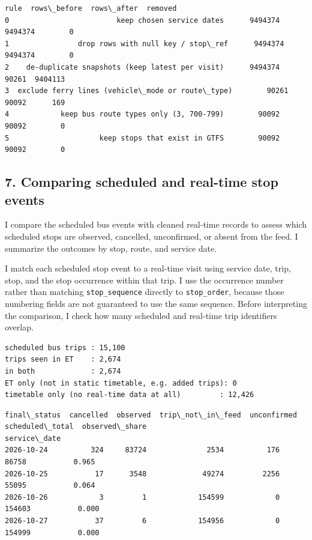 \documentclass[11pt]{article}
\begin{document}
    
    \begin{Verbatim}[commandchars=\\\{\}]
                                               rule  rows\_before  rows\_after  removed
0                         keep chosen service dates      9494374     9494374        0
1                drop rows with null key / stop\_ref      9494374     9494374        0
2    de-duplicate snapshots (keep latest per visit)      9494374       90261  9404113
3  exclude ferry lines (vehicle\_mode or route\_type)        90261       90092      169
4            keep bus route types only (3, 700-799)        90092       90092        0
5                     keep stops that exist in GTFS        90092       90092        0
    \end{Verbatim}

    
    \subsection{7. Comparing scheduled and real-time stop
events}\label{comparing-scheduled-and-real-time-stop-events}

I compare the scheduled bus events with cleaned real-time records to
assess which scheduled stops are observed, cancelled, unconfirmed, or
absent from the feed. I summarize the outcomes by stop, route, and
service date.

    I match each scheduled stop event to a real-time visit using service
date, trip, stop, and the stop occurrence within that trip. I use the
occurrence number rather than matching \texttt{stop\_sequence} directly
to \texttt{stop\_order}, because those numbering fields are not
guaranteed to use the same sequence. Before interpreting the comparison,
I check how many scheduled and real-time trip identifiers overlap.

    \begin{Verbatim}[commandchars=\\\{\}]
scheduled bus trips : 15,100
trips seen in ET    : 2,674
in both             : 2,674
ET only (not in static timetable, e.g. added trips): 0
timetable only (no real-time data at all)         : 12,426
    \end{Verbatim}

    
    \begin{Verbatim}[commandchars=\\\{\}]
final\_status  cancelled  observed  trip\_not\_in\_feed  unconfirmed  scheduled\_total  observed\_share
service\_date                                                                                     
2026-10-24          324     83724              2534          176            86758           0.965
2026-10-25           17      3548             49274         2256            55095           0.064
2026-10-26            3         1            154599            0           154603           0.000
2026-10-27           37         6            154956            0           154999           0.000
    \end{Verbatim}
\end{document}
